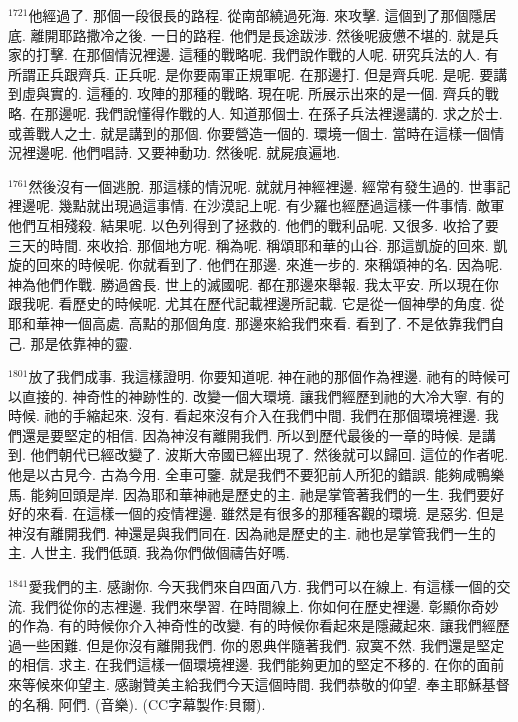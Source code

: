 \documentclass{book}
\begin{document}
$^{1721}$他經過了.
那個一段很長的路程.
從南部繞過死海.
來攻擊.
這個到了那個隱居底.
離開耶路撒冷之後.
一日的路程.
他們是長途跋涉.
然後呢疲憊不堪的.
就是兵家的打擊.
在那個情況裡邊.
這種的戰略呢.
我們說作戰的人呢.
研究兵法的人.
有所謂正兵跟齊兵.
正兵呢.
是你要兩軍正規軍呢.
在那邊打.
但是齊兵呢.
是呢.
要講到虛與實的.
這種的.
攻陣的那種的戰略.
現在呢.
所展示出來的是一個.
齊兵的戰略.
在那邊呢.
我們說懂得作戰的人.
知道那個士.
在孫子兵法裡邊講的.
求之於士.
或善戰人之士.
就是講到的那個.
你要營造一個的.
環境一個士.
當時在這樣一個情況裡邊呢.
他們唱詩.
又要神動功.
然後呢.
就屍痕遍地.

$^{1761}$然後沒有一個逃脫.
那這樣的情況呢.
就就月神經裡邊.
經常有發生過的.
世事記裡邊呢.
幾點就出現過這事情.
在沙漠記上呢.
有少羅也經歷過這樣一件事情.
敵軍他們互相殘殺.
結果呢.
以色列得到了拯救的.
他們的戰利品呢.
又很多.
收拾了要三天的時間.
來收拾.
那個地方呢.
稱為呢.
稱頌耶和華的山谷.
那這凱旋的回來.
凱旋的回來的時候呢.
你就看到了.
他們在那邊.
來進一步的.
來稱頌神的名.
因為呢.
神為他們作戰.
勝過酋長.
世上的滅國呢.
都在那邊來舉報.
我太平安.
所以現在你跟我呢.
看歷史的時候呢.
尤其在歷代記載裡邊所記載.
它是從一個神學的角度.
從耶和華神一個高處.
高點的那個角度.
那邊來給我們來看.
看到了.
不是依靠我們自己.
那是依靠神的靈.

$^{1801}$放了我們成事.
我這樣證明.
你要知道呢.
神在祂的那個作為裡邊.
祂有的時候可以直接的.
神奇性的神跡性的.
改變一個大環境.
讓我們經歷到祂的大冷大寧.
有的時候.
祂的手縮起來.
沒有.
看起來沒有介入在我們中間.
我們在那個環境裡邊.
我們還是要堅定的相信.
因為神沒有離開我們.
所以到歷代最後的一章的時候.
是講到.
他們朝代已經改變了.
波斯大帝國已經出現了.
然後就可以歸回.
這位的作者呢.
他是以古見今.
古為今用.
全車可鑒.
就是我們不要犯前人所犯的錯誤.
能夠咸鴨樂馬.
能夠回頭是岸.
因為耶和華神祂是歷史的主.
祂是掌管著我們的一生.
我們要好好的來看.
在這樣一個的疫情裡邊.
雖然是有很多的那種客觀的環境.
是惡劣.
但是神沒有離開我們.
神還是與我們同在.
因為祂是歷史的主.
祂也是掌管我們一生的主.
人世主.
我們低頭.
我為你們做個禱告好嗎.

$^{1841}$愛我們的主.
感謝你.
今天我們來自四面八方.
我們可以在線上.
有這樣一個的交流.
我們從你的志裡邊.
我們來學習.
在時間線上.
你如何在歷史裡邊.
彰顯你奇妙的作為.
有的時候你介入神奇性的改變.
有的時候你看起來是隱藏起來.
讓我們經歷過一些困難.
但是你沒有離開我們.
你的恩典伴隨著我們.
寂寞不然.
我們還是堅定的相信.
求主.
在我們這樣一個環境裡邊.
我們能夠更加的堅定不移的.
在你的面前來等候來仰望主.
感謝贊美主給我們今天這個時間.
我們恭敬的仰望.
奉主耶穌基督的名稱.
阿們.
(音樂).
(CC字幕製作:貝爾).
\newpage
\end{document}
